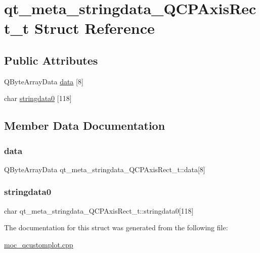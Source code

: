 \hypertarget{structqt__meta__stringdata__QCPAxisRect__t}{}\section{qt\+\_\+meta\+\_\+stringdata\+\_\+\+Q\+C\+P\+Axis\+Rect\+\_\+t Struct Reference}
\label{structqt__meta__stringdata__QCPAxisRect__t}
\subsection*{Public Attributes}
\begin{DoxyCompactItemize}
\item 
Q\+Byte\+Array\+Data \mbox{\hyperlink{structqt__meta__stringdata__QCPAxisRect__t_abe371091541ce1b738a7026d4387d5b2}{data}} \mbox{[}8\mbox{]}
\item 
char \mbox{\hyperlink{structqt__meta__stringdata__QCPAxisRect__t_a7263fed0445758459e2610e1b9fffe05}{stringdata0}} \mbox{[}118\mbox{]}
\end{DoxyCompactItemize}


\subsection{Member Data Documentation}
\mbox{\label{structqt__meta__stringdata__QCPAxisRect__t_abe371091541ce1b738a7026d4387d5b2}} 
\subsubsection{\texorpdfstring{data}{data}}
{\footnotesize\ttfamily Q\+Byte\+Array\+Data qt\+\_\+meta\+\_\+stringdata\+\_\+\+Q\+C\+P\+Axis\+Rect\+\_\+t\+::data\mbox{[}8\mbox{]}}

\mbox{\label{structqt__meta__stringdata__QCPAxisRect__t_a7263fed0445758459e2610e1b9fffe05}} 
\subsubsection{\texorpdfstring{stringdata0}{stringdata0}}
{\footnotesize\ttfamily char qt\+\_\+meta\+\_\+stringdata\+\_\+\+Q\+C\+P\+Axis\+Rect\+\_\+t\+::stringdata0\mbox{[}118\mbox{]}}



The documentation for this struct was generated from the following file\+:\begin{DoxyCompactItemize}
\item 
\mbox{\hyperlink{moc__qcustomplot_8cpp}{moc\+\_\+qcustomplot.\+cpp}}\end{DoxyCompactItemize}
